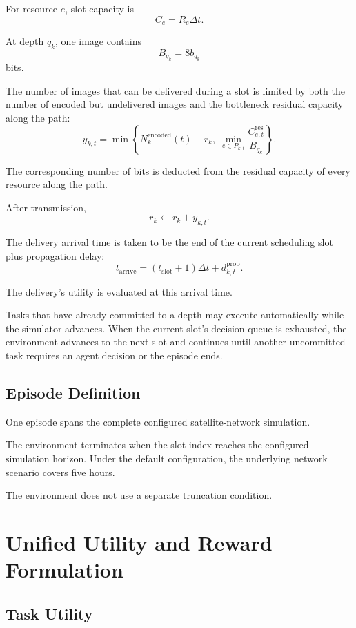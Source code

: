 \documentclass[11pt]{article}
\begin{document}
For resource $e$, slot capacity is
\[
C_e=R_e\Delta t.
\]

At depth $q_k$, one image contains
\[
B_{q_k}=8b_{q_k}
\]
bits.

The number of images that can be delivered during a slot is limited by both
the number of encoded but undelivered images and the bottleneck residual
capacity along the path:
\[
y_{k,t}
=
\min
\left\{
N_k^{\mathrm{encoded}}(t)-r_k,\;
\min_{e\in P_{k,t}}
\frac{C^{\mathrm{res}}_{e,t}}{B_{q_k}}
\right\}.
\]

The corresponding number of bits is deducted from the residual capacity of
every resource along the path.

After transmission,
\[
r_k
\leftarrow
r_k+y_{k,t}.
\]

The delivery arrival time is taken to be the end of the current scheduling
slot plus propagation delay:
\[
t_{\mathrm{arrive}}
=
(t_{\mathrm{slot}}+1)\Delta t
+
d^{\mathrm{prop}}_{k,t}.
\]

The delivery's utility is evaluated at this arrival time.

Tasks that have already committed to a depth may execute automatically while
the simulator advances. When the current slot's decision queue is exhausted,
the environment advances to the next slot and continues until another
uncommitted task requires an agent decision or the episode ends.


\subsection{Episode Definition}

One episode spans the complete configured satellite-network simulation.

The environment terminates when the slot index reaches the configured
simulation horizon. Under the default configuration, the underlying network
scenario covers five hours.

The environment does not use a separate truncation condition.


\section{Unified Utility and Reward Formulation}

\subsection{Task Utility}
\end{document}
